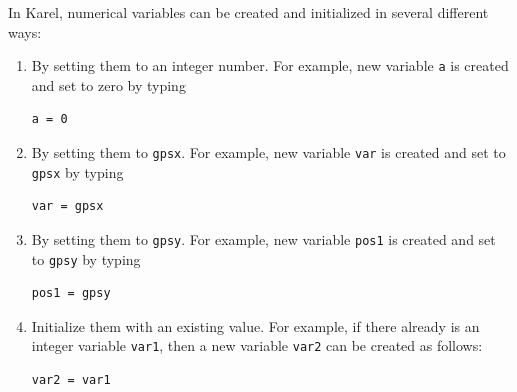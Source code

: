 In Karel, numerical variables can be created and initialized in several different ways: 
\begin{enumerate}
\item By setting them to an integer number. For example, new variable {\tt a} is created and set to zero by typing \\

\begin{bboxshort}
\begin{Verbatim}[commandchars=\\\{\}]
a = 0
\end{Verbatim}
\end{bboxshort}
\vspace{1mm}

\noindent
\item By setting them to {\tt gpsx}. For example, new variable {\tt var} is created and set to {\tt gpsx} by typing\\

\begin{bboxshort}
\begin{Verbatim}[commandchars=\\\{\}]
var = gpsx
\end{Verbatim}
\end{bboxshort}
\vspace{1mm}

\noindent
\item By setting them to {\tt gpsy}. For example, new variable {\tt pos1} is created and set to {\tt gpsy} by typing\\

\begin{bboxshort}
\begin{Verbatim}[commandchars=\\\{\}]
pos1 = gpsy
\end{Verbatim}
\end{bboxshort}
\vspace{1mm}

\noindent
\item Initialize them with an existing value. For example, if there already is an integer variable 
{\tt var1}, then a new variable {\tt var2} can be created as follows:\\

\begin{bboxshort}
\begin{Verbatim}[commandchars=\\\{\}]
var2 = var1
\end{Verbatim}
\end{bboxshort}
\vspace{1mm}


\end{enumerate}
